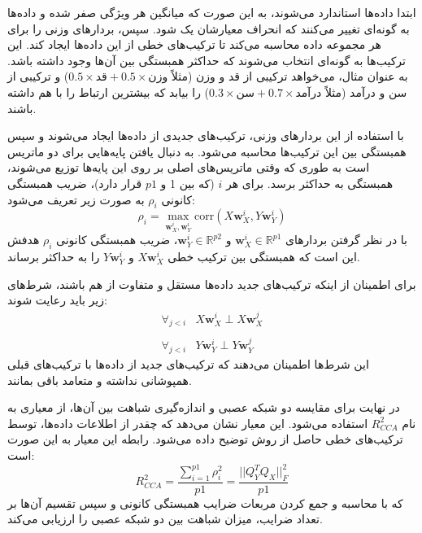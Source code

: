 ابتدا داده‌ها استاندارد می‌شوند، به این صورت که میانگین هر ویژگی صفر شده و داده‌ها به گونه‌ای تغییر می‌کنند که انحراف معیارشان یک شود. سپس،
بردارهای وزنی را برای هر مجموعه داده محاسبه می‌کند تا ترکیب‌های خطی از این داده‌ها ایجاد کند. این ترکیب‌ها به گونه‌ای انتخاب می‌شوند که حداکثر همبستگی بین آن‌ها وجود داشته باشد. به عنوان مثال،
می‌خواهد ترکیبی از قد و وزن (مثلاً \(0.5 \times \text{قد} + 0.5 \times \text{وزن}\)) و ترکیبی از سن و درآمد (مثلاً \(0.3 \times \text{سن} + 0.7 \times \text{درآمد}\)) را بیابد که بیشترین ارتباط را با هم داشته باشند.

با استفاده از این بردارهای وزنی، ترکیب‌های جدیدی از داده‌ها ایجاد می‌شوند و سپس همبستگی بین این ترکیب‌ها محاسبه می‌شود.
به دنبال یافتن پایه‌هایی برای دو ماتریس است به طوری که وقتی ماتریس‌های اصلی بر روی این پایه‌ها توزیع می‌شوند، همبستگی به حداکثر برسد. برای هر \(i\) (که بین 1 و \(p1\) قرار دارد)، ضریب همبستگی کانونی \( \rho_i \) به صورت زیر تعریف می‌شود: 
\begin{equation}
	\rho_i = \max_{\mathbf{w}_X^i, \mathbf{w}_Y^i} \text{corr}(X \mathbf{w}_X^i, Y \mathbf{w}_Y^i)
\end{equation}
با در نظر گرفتن بردارهای \(\mathbf{w}_X^i \in \mathbb{R}^{p1}\) و \(\mathbf{w}_Y^i \in \mathbb{R}^{p2}\)، ضریب همبستگی کانونی \( \rho_i \) هدفش این است که همبستگی بین ترکیب خطی \( X \mathbf{w}_X^i \) و \( Y \mathbf{w}_Y^i \) را به حداکثر برساند.

برای اطمینان از اینکه ترکیب‌های جدید داده‌ها مستقل و متفاوت از هم باشند، شرط‌های زیر باید رعایت شوند:
\begin{equation}
	\begin{array}{ll}
		\forall_{j<i} & X \mathbf{w}_X^i \perp X \mathbf{w}_X^j
		\\
		\\
		\forall_{j<i} & Y \mathbf{w}_Y^i \perp Y \mathbf{w}_Y^j
	\end{array}
\end{equation}
این شرط‌ها اطمینان می‌دهند که ترکیب‌های جدید از داده‌ها با ترکیب‌های قبلی همپوشانی نداشته و متعامد باقی بمانند.

در نهایت برای مقایسه دو شبکه عصبی و اندازه‌گیری شباهت بین آن‌ها، از معیاری به نام \( R^2_{CCA} \) استفاده می‌شود. این معیار نشان می‌دهد که چقدر از اطلاعات داده‌ها، توسط ترکیب‌های خطی حاصل از روش
توضیح داده می‌شود. رابطه این معیار به این صورت است:
\begin{equation}
	R^2_{CCA} = \frac{\sum_{i=1}^{p1} \rho^2_i}{p1} = \frac{||Q^T_Y Q_X||^2_F}{p1}
	\label{eq_CCA}
\end{equation}
که با محاسبه و جمع کردن مربعات ضرایب همبستگی کانونی و سپس تقسیم آن‌ها بر تعداد ضرایب، میزان شباهت بین دو شبکه عصبی را ارزیابی می‌کند.

